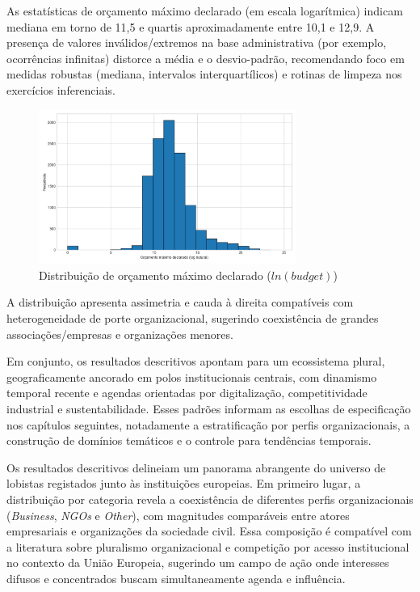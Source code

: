 As estatísticas de orçamento máximo declarado (em escala logarítmica) indicam mediana em torno de 11,5 e quartis aproximadamente entre 10,1 e 12,9. A presença de valores inválidos/extremos na base administrativa (por exemplo, ocorrências infinitas) distorce a média e o desvio-padrão, recomendando foco em medidas robustas (mediana, intervalos interquartílicos) e rotinas de limpeza nos exercícios inferenciais.

\begin{figure}[!htbp]
\centering
\includegraphics[width=0.75\textwidth]{figures/budget_ln_hist.png}
\caption{Distribuição de orçamento máximo declarado ($ln(budget)$)}
\end{figure}

A distribuição apresenta assimetria e cauda à direita compatíveis com heterogeneidade de porte organizacional, sugerindo coexistência de grandes associações/empresas e organizações menores.


Em conjunto, os resultados descritivos apontam para um ecossistema plural, geograficamente ancorado em polos institucionais centrais, com dinamismo temporal recente e agendas orientadas por digitalização, competitividade industrial e sustentabilidade. Esses padrões informam as escolhas de especificação nos capítulos seguintes, notadamente a estratificação por perfis organizacionais, a construção de domínios temáticos e o controle para tendências temporais.


Os resultados descritivos delineiam um panorama abrangente do universo de lobistas registados junto às instituições europeias. Em primeiro lugar, a distribuição por categoria revela a coexistência de diferentes perfis organizacionais (\textit{Business}, \textit{NGOs} e \textit{Other}), com magnitudes comparáveis entre atores empresariais e organizações da sociedade civil. Essa composição é compatível com a literatura sobre pluralismo organizacional e competição por acesso institucional no contexto da União Europeia, sugerindo um campo de ação onde interesses difusos e concentrados buscam simultaneamente agenda e influência.


